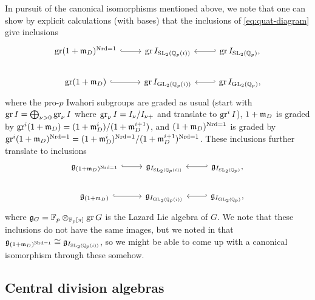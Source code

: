 In pursuit of the canonical isomorphisms mentioned above, we note that one can show by explicit calculations (with bases) that the inclusions of \eqref{eq:quat-diagram} give inclusions
\begin{equation*}
  \begin{tikzcd}
    \gr (1+\idm_{D})^{\Nrd = 1} \ar[r, hook] & \gr I_{\SL_{2}(\Q_{p}(i))} & \ar[l, hook'] \gr I_{\SL_{2}(\Q_{p})}, \\
    \gr (1+\idm_{D}) \ar[r, hook] & \gr I_{\GL_{2}(\Q_{p}(i))} & \ar[l, hook'] \gr I_{\GL_{2}(\Q_{p})},
  \end{tikzcd}
\end{equation*}
where the pro-$p$ Iwahori subgroups are graded as usual (start with $\operatorname{gr} I = \bigoplus_{\nu>0} \operatorname{gr}_{\nu} I$ where $\operatorname{gr}_{\nu} I = I_{\nu}/I_{\nu+}$ and translate to $\operatorname{gr}^{i} I$), $1+\mathfrak{m}_{D}$ is graded by $\operatorname{gr}^{i}(1+\mathfrak{m}_{D}) = (1+\mathfrak{m}_{D}^{i})/(1+\mathfrak{m}_{D}^{i+1})$, and $(1+\mathfrak{m}_{D})^{\operatorname{Nrd} = 1}$ is graded by $\operatorname{gr}^{i}(1+\mathfrak{m}_{D})^{\operatorname{Nrd} = 1} = (1+\mathfrak{m}_{D}^{i})^{\operatorname{Nrd} = 1}/(1+\mathfrak{m}_{D}^{i+1})^{\operatorname{Nrd} = 1}$. These inclusions further translate to inclusions
\begin{equation*}
  \begin{tikzcd}
    \lie{g}_{(1+\idm_{D})^{\Nrd = 1}} \ar[r, hook] & \lie{g}_{I_{\SL_{2}(\Q_{p}(i))}} & \ar[l, hook'] \lie{g}_{I_{\SL_{2}(\Q_{p})}}, \\
    \lie{g}_{(1+\idm_{D})} \ar[r, hook] & \lie{g}_{I_{\GL_{2}(\Q_{p}(i))}} & \ar[l, hook'] \lie{g}_{I_{\GL_{2}(\Q_{p})}},
  \end{tikzcd}
\end{equation*}
where $\mathfrak{g}_{G} = \mathbb{F}_{p} \otimes_{\mathbb{F}_{p}[\pi]} \operatorname{gr} G$ is the Lazard Lie algebra of $G$. We note that these inclusions do not have the same images, but we noted in  that $\mathfrak{g}_{(1+\mathfrak{m}_{D})^{\operatorname{Nrd} = 1}} \cong \mathfrak{g}_{I_{\operatorname{SL}_{2}(\mathbb{Q}_{p}(i))}}$, so we might be able to come up with a canonical isomorphism through these somehow.


\subsection{Central division algebras}%
\label{subsec:central-div-algs}

